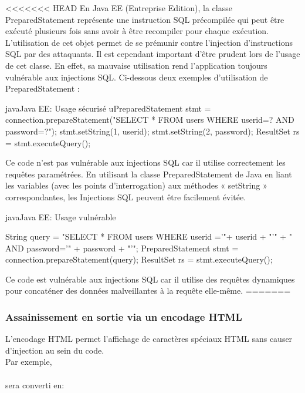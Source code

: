 \documentclass[twoside,a4paper,12pt,titlepage]{book}
\begin{document}
<<<<<<< HEAD
En Java EE (Entreprise Edition), la classe PreparedStatement représente une instruction SQL précompilée qui peut être exécuté plusieurs fois sans avoir à être recompiler pour chaque exécution.
L’utilisation de cet objet permet de se prémunir contre l’injection d’instructions SQL par des attaquants.
Il est cependant important d’être prudent lors de l’usage de cet classe. En effet, sa mauvaise utilisation rend l’application toujours vulnérable aux injections SQL.
Ci-dessous deux exemples d’utilisation de PreparedStatement :

\begin{Config}{java}{Java EE: Usage sécurisé }
uPreparedStatement stmt = connection.prepareStatement("SELECT * FROM users WHERE userid=? AND password=?");
stmt.setString(1, userid);
stmt.setString(2, password);
ResultSet rs = stmt.executeQuery();

\end{Config}	

Ce code n’est pas vulnérable aux injections SQL car il utilise correctement les requêtes paramétrées. En utilisant la classe PreparedStatement de Java en liant les variables (avec les points d'interrogation) aux méthodes « setString » correspondantes, les  Injections SQL peuvent être facilement évitée.

\begin{Config}{java}{Java EE: Usage vulnérable }

String query = "SELECT * FROM users WHERE userid ='"+ userid + "'" + " AND password='" + password + "'";
PreparedStatement stmt = connection.prepareStatement(query);
ResultSet rs = stmt.executeQuery();

\end{Config}	

Ce code est vulnérable aux injections SQL car il utilise des requêtes dynamiques pour concaténer des données malveillantes à la requête elle-même. 
=======
\subsubsection{Assainissement en sortie via un encodage HTML}
L'encodage HTML permet l'affichage de caractères spéciaux HTML sans causer d'injection au sein du code.\\
Par exemple, \\
\indent {}\\
sera converti en:\\
\indent {}\\
\end{document}

